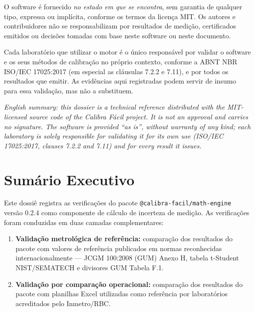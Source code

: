 \documentclass[11pt,a4paper]{article}
\newcommand{\docVersion}{0.2.4}
\begin{document}
O software é fornecido \emph{no estado em que se encontra}, sem garantia de qualquer tipo, expressa ou implícita, conforme os termos da licença MIT. Os autores e contribuidores não se responsabilizam por resultados de medição, certificados emitidos ou decisões tomadas com base neste software ou neste documento.

Cada laboratório que utilizar o motor é o único responsável por validar o software e os seus métodos de calibração no próprio contexto, conforme a ABNT NBR ISO/IEC 17025:2017 (em especial as cláusulas 7.2.2 e 7.11), e por todos os resultados que emitir. As evidências aqui registradas podem servir de insumo para essa validação, mas não a substituem.

\vspace{0.2cm}
{\small\itshape English summary: this dossier is a technical reference distributed with the MIT-licensed source code of the Calibra Fácil project. It is not an approval and carries no signature. The software is provided ``as is'', without warranty of any kind; each laboratory is solely responsible for validating it for its own use (ISO/IEC 17025:2017, clauses 7.2.2 and 7.11) and for every result it issues.}

\tableofcontents

\clearpage

\section{Sumário Executivo}

Este dossiê registra as verificações do pacote \texttt{@calibra-facil/math-engine} versão \docVersion{} como componente de cálculo de incerteza de medição. As verificações foram conduzidas em duas camadas complementares:

\begin{enumerate}
  \item \textbf{Validação metrológica de referência:} comparação dos resultados do pacote com valores de referência publicados em normas reconhecidas internacionalmente --- JCGM 100:2008 (GUM) Anexo H, tabela t-Student NIST/SEMATECH e divisores GUM Tabela F.1.
  \item \textbf{Validação por comparação operacional:} comparação dos resultados do pacote com planilhas Excel utilizadas como referência por laboratórios acreditados pelo Inmetro/RBC.
\end{enumerate}
\end{document}
